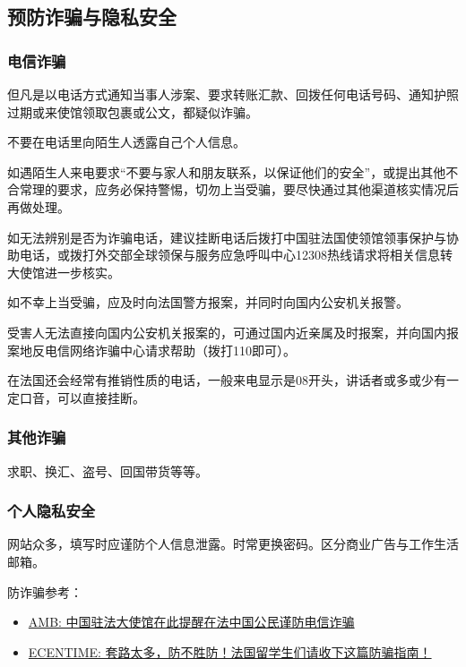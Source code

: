 \subsection{预防诈骗与隐私安全}

\subsubsection{电信诈骗}
但凡是以电话方式通知当事人涉案、要求转账汇款、回拨任何电话号码、通知护照过期或来使馆领取包裹或公文，都疑似诈骗。

不要在电话里向陌生人透露自己个人信息。

如遇陌生人来电要求“不要与家人和朋友联系，以保证他们的安全”，或提出其他不合常理的要求，应务必保持警惕，切勿上当受骗，要尽快通过其他渠道核实情况后再做处理。

如无法辨别是否为诈骗电话，建议挂断电话后拨打中国驻法国使领馆领事保护与协助电话，或拨打外交部全球领保与服务应急呼叫中心12308热线请求将相关信息转大使馆进一步核实。

如不幸上当受骗，应及时向法国警方报案，并同时向国内公安机关报警。

受害人无法直接向国内公安机关报案的，可通过国内近亲属及时报案，并向国内报案地反电信网络诈骗中心请求帮助（拨打110即可）。

在法国还会经常有推销性质的电话，一般来电显示是08开头，讲话者或多或少有一定口音，可以直接挂断。

\subsubsection{其他诈骗}
求职、换汇、盗号、回国带货等等。

\subsubsection{个人隐私安全}
网站众多，填写时应谨防个人信息泄露。时常更换密码。区分商业广告与工作生活邮箱。

防诈骗参考：
\begin{itemize}
    \item \href{http://www.amb-chine.fr/chn/sgxw/t1823322.htm}{AMB: 中国驻法大使馆在此提醒在法中国公民谨防电信诈骗}
    \item \href{https://www.ecentime.com/article/bien-vivre-en-france}{ECENTIME: 套路太多，防不胜防！法国留学生们请收下这篇防骗指南！}
\end{itemize}
